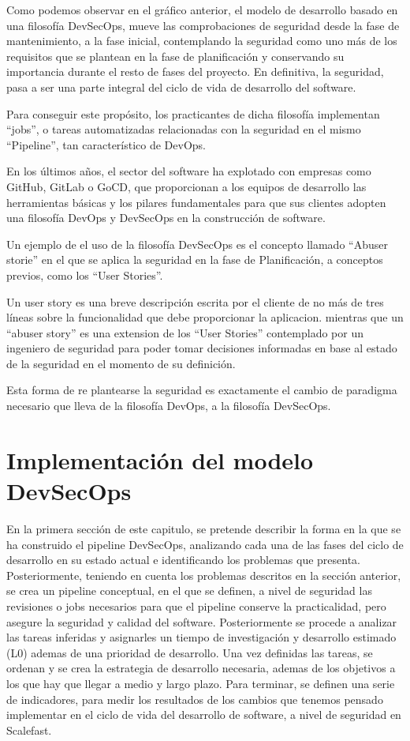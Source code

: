\documentclass[12pt]{report} %
\begin{document}
Como podemos observar en el gráfico anterior, el modelo de desarrollo basado en
una filosofía DevSecOps, mueve las comprobaciones de seguridad desde la fase de
mantenimiento, a la fase inicial, contemplando la seguridad como uno más de los
requisitos que se plantean en la fase de planificación y conservando su
importancia durante el resto de fases del proyecto.  En definitiva, la
seguridad, pasa a ser una parte integral del ciclo de vida de desarrollo del
software. 

Para conseguir este propósito, los practicantes de dicha filosofía implementan
``jobs'', o tareas automatizadas relacionadas con la seguridad en el mismo
``Pipeline'', tan característico de DevOps.

En los últimos años, el sector del software ha explotado con empresas como
GitHub, GitLab o GoCD, que proporcionan a los equipos de desarrollo las
herramientas básicas y los pilares fundamentales para que sus clientes adopten
una filosofía DevOps y DevSecOps en la construcción de
software.\cite{Google2019}

Un ejemplo de el uso de la filosofía DevSecOps es el concepto llamado ``Abuser
storie'' \cite{Bor2006} en el que se aplica la seguridad en la fase de
Planificación, a conceptos previos, como los ``User Stories''.

Un user story es una breve descripción escrita por el cliente de no más de tres
líneas sobre la funcionalidad que debe proporcionar la aplicacion.
\cite{XPUserStory} mientras que un ``abuser story'' es una extension de los
``User Stories'' contemplado por un ingeniero de seguridad para poder tomar
decisiones informadas en base al estado de la seguridad en el momento de su
definición. \cite{Bor2006}

Esta forma de re plantearse la seguridad es exactamente el cambio de paradigma
necesario que lleva de la filosofía \gls{DevOps}, a la filosofía 
\gls{DevSecOps}.


\chapter{Implementación del modelo DevSecOps}

En la primera sección de este capitulo, se pretende describir la forma en la que
se ha construido el pipeline DevSecOps, analizando cada una de las fases del
ciclo de desarrollo en su estado actual e identificando los problemas que
presenta.
Posteriormente, teniendo en cuenta los problemas descritos en la sección
anterior, se crea un pipeline conceptual, en el que se definen, a nivel de
seguridad las revisiones o \gls{job}s necesarios para que el \gls{pipeline}
conserve la practicalidad, pero asegure la seguridad y calidad del software.
Posteriormente se procede a analizar las tareas inferidas y asignarles un tiempo
de investigación y desarrollo estimado (L0) ademas de una prioridad de
desarrollo.
Una vez definidas las tareas, se ordenan y se crea la estrategia de desarrollo
necesaria, ademas de los objetivos a los que hay que llegar a medio y largo
plazo.
Para terminar, se definen una serie de indicadores, para medir los resultados de
los cambios que tenemos pensado implementar en el ciclo de vida del desarrollo
de software, a nivel de seguridad en Scalefast.
\end{document}
